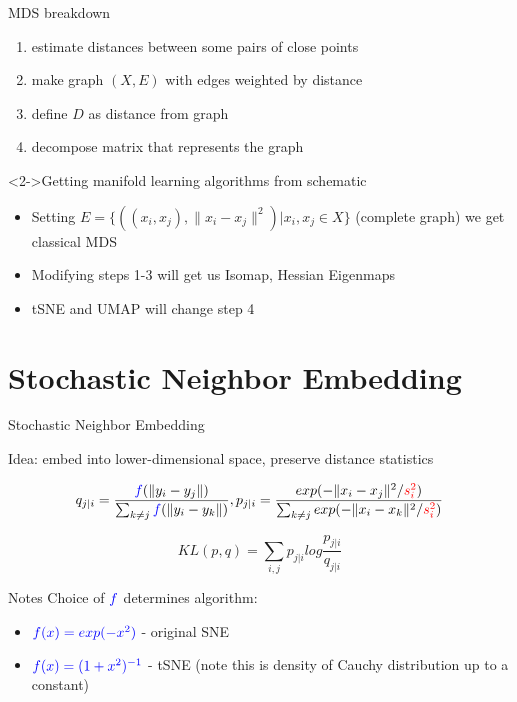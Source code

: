 \documentclass[unknownkeysallowed]{beamer}
\begin{document}
\begin{frame}{MDS breakdown}


	\begin{enumerate}
	   \item estimate distances between some pairs of close points
	   \item make graph $(X, E)$ with edges weighted by distance
	   \item define $D$ as distance from graph
	   \item decompose matrix that represents the graph
	\end{enumerate}{}

	\begin{block}<2->{Getting manifold learning algorithms from schematic}

	\begin{itemize}
		\item Setting $E = \{((x_i, x_j), \|x_i - x_j\|^2) | x_i, x_j \in X \}$ (complete graph) we get classical MDS
		\item Modifying steps 1-3 will get us Isomap, Hessian Eigenmaps
		\item tSNE and UMAP will change step 4
	\end{itemize}
	\end{block}



\end{frame}

\section{Stochastic Neighbor Embedding}
\begin{frame}{Stochastic Neighbor Embedding}

	Idea: embed into lower-dimensional space, preserve distance statistics

	$$q_{j|i} = \frac{\textcolor{blue}{f}(\|y_i - y_j\|)}{\sum_{k \neq j}\textcolor{blue}{f}(\|y_i - y_k\|)}, p_{j|i} = \frac{exp(-\|x_i - x_j\|^2 / \textcolor{red}{s^2_i})}{\sum_{k \neq j}exp(-\|x_i - x_k\|^2/\textcolor{red}{s^2_i})}$$

	$$KL(p, q) = \sum_{i, j} p_{j|i} log\frac{p_{j|i}}{q_{j|i}}$$

	\begin{block}{Notes}
	Choice of $\textcolor{blue}{f}$ determines algorithm:
	\begin{itemize}
		\item $\textcolor{blue}{f(x) = exp(-x^2)}$ - original SNE
		\item $\textcolor{blue}{f(x) = (1 + x^2)^{-1}}$ - tSNE (note this is density of Cauchy distribution up to a constant)
	\end{itemize}
	\end{block}
\end{frame}
\end{document}

